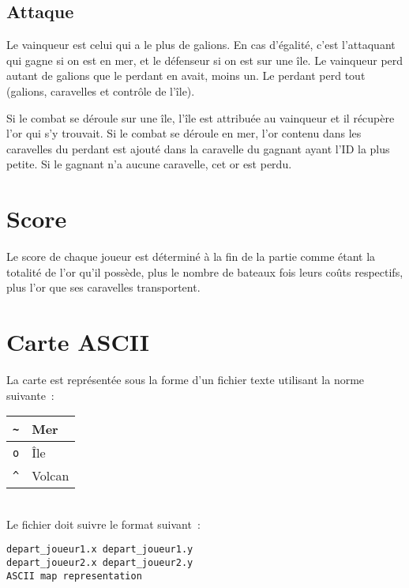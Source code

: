 \subsection{Attaque}
Le vainqueur est celui qui a le plus de galions. En cas d'égalité, c'est
l'attaquant qui gagne si on est en mer, et le défenseur si on est sur une
île. Le vainqueur perd autant de galions que le perdant en avait, moins
un. Le perdant perd tout (galions, caravelles et contrôle de l'île).

Si le combat se déroule sur une île, l'île est attribuée au vainqueur et il
récupère l'or qui s'y trouvait. Si le combat se déroule en mer, l'or contenu
dans les caravelles du perdant est ajouté dans la caravelle du gagnant ayant
l'ID la plus petite. Si le gagnant n'a aucune caravelle, cet or est perdu.

\section{Score}
Le score de chaque joueur est déterminé à la fin de la partie comme étant la
totalité de l'or qu'il possède, plus le nombre de bateaux fois leurs coûts
respectifs, plus l'or que ses caravelles transportent.

\section{Carte ASCII}
La carte est représentée sous la forme d'un fichier texte utilisant la norme
suivante~:\\

\begin{tabular}{ | c | l | }
	\hline
	\verb|~| & Mer \\ \hline
	\verb|o| & Île \\ \hline
	\verb|^| & Volcan \\ \hline
\end{tabular}\\

Le fichier doit suivre le format suivant~:
\begin{verbatim}depart_joueur1.x depart_joueur1.y
depart_joueur2.x depart_joueur2.y
ASCII map representation\end{verbatim}

